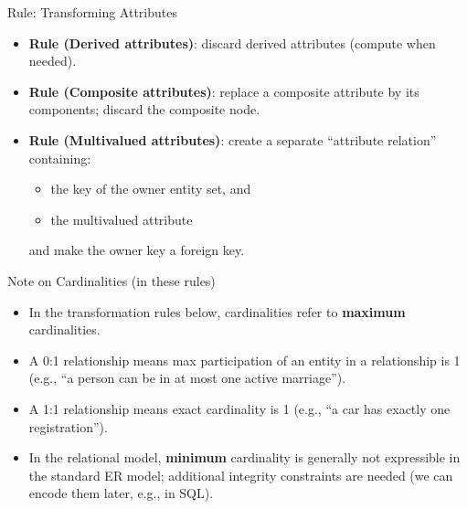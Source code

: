 \documentclass[10pt,aspectratio=169]{beamer}
\newcommand{\keyattr}[1]{\underline{#1}}
\begin{document}
\begin{frame}{Rule: Transforming Attributes}
\small
\begin{itemize}
  \item \textbf{Rule (Derived attributes)}: discard derived attributes (compute when needed).
  \item \textbf{Rule (Composite attributes)}: replace a composite attribute by its components; discard the composite node.
  \item \textbf{Rule (Multivalued attributes)}: create a separate ``attribute relation'' containing:
  \begin{itemize}
    \item the key of the owner entity set, and
    \item the multivalued attribute
  \end{itemize}
  and make the owner key a foreign key.
\end{itemize}

\vspace{2mm}
\centering
{}
\end{frame}

\begin{frame}{Note on Cardinalities (in these rules)}
\small
\begin{itemize}
  \item In the transformation rules below, cardinalities refer to \textbf{maximum} cardinalities.
  \item A 0:1 relationship means max participation of an entity in a relationship is 1 (e.g., ``a person can be in at most one active marriage'').
    \item A 1:1 relationship means exact cardinality is 1 (e.g., ``a car has exactly one registration'').
  \item In the relational model, \textbf{minimum} cardinality is generally not expressible in the standard ER model;
        additional integrity constraints are needed (we can encode them later, e.g., in SQL).
\end{itemize}
\end{frame}
\end{document}
